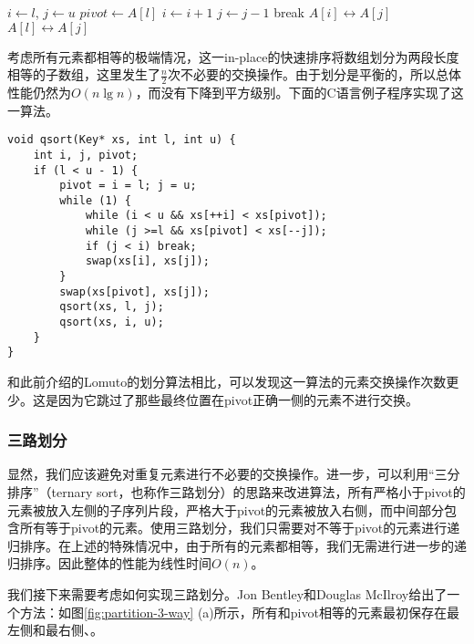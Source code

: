 \documentclass[UTF8]{article}
\begin{document}
\begin{algorithmic}[1]
 \Comment{sort range $[l, u)$}
   
    \State $i \gets l$, $j \gets u$
    \State $pivot \gets A[l]$
    \Loop
      \Repeat
        \State $i \gets i + 1$
       
      \Repeat
        \State $j \gets j - 1$
       
        \State break
      \EndIf
      \State {} $A[i] \leftrightarrow A[j]$
    \EndLoop
    \State {} $A[l] \leftrightarrow A[j]$ 
    \State {}
    \State {}
  \EndIf
\EndProcedure
\end{algorithmic}

考虑所有元素都相等的极端情况，这一in-place的快速排序将数组划分为两段长度相等的子数组，这里发生了$\frac{n}{2}$次不必要的交换操作。由于划分是平衡的，所以总体性能仍然为$O(n \lg n)$，而没有下降到平方级别。下面的C语言例子程序实现了这一算法。

\lstset{language=C}
\begin{lstlisting}
void qsort(Key* xs, int l, int u) {
    int i, j, pivot;
    if (l < u - 1) {
        pivot = i = l; j = u;
        while (1) {
            while (i < u && xs[++i] < xs[pivot]);
            while (j >=l && xs[pivot] < xs[--j]);
            if (j < i) break;
            swap(xs[i], xs[j]);
        }
        swap(xs[pivot], xs[j]);
        qsort(xs, l, j);
        qsort(xs, i, u);
    }
}
\end{lstlisting}

和此前介绍的Lomuto的划分算法相比，可以发现这一算法的元素交换操作次数更少。这是因为它跳过了那些最终位置在pivot正确一侧的元素不进行交换。

\subsubsection{三路划分}

显然，我们应该避免对重复元素进行不必要的交换操作。进一步，可以利用“三分排序”（ternary sort，也称作三路划分）的思路来改进算法，所有严格小于pivot的元素被放入左侧的子序列片段，严格大于pivot的元素被放入右侧，而中间部分包含所有等于pivot的元素。使用三路划分，我们只需要对不等于pivot的元素进行递归排序。在上述的特殊情况中，由于所有的元素都相等，我们无需进行进一步的递归排序。因此整体的性能为线性时间$O(n)$。

我们接下来需要考虑如何实现三路划分。Jon Bentley和Douglas McIlroy给出了一个方法：如图\ref{fig:partition-3-way} (a)所示，所有和pivot相等的元素最初保存在最左侧和最右侧\cite{3-way-part}、\cite{opt-qs}。
\end{document}
